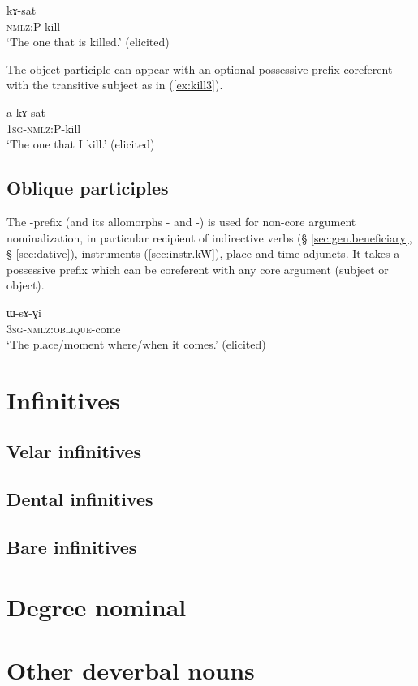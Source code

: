  \begin{exe} 
\ex \label{ex:kill2}
\gll kɤ-sat    \\
   \textsc{nmlz}:P-kill \\
 \glt  `The one that is killed.' (elicited)
 \end{exe}
 
The object participle can appear with an optional possessive prefix coreferent with the transitive subject as in (\ref{ex:kill3}).
  
  \begin{exe}
\ex \label{ex:kill3}
\gll a-kɤ-sat    \\
   \textsc{1sg-nmlz}:P-kill \\
 \glt  `The one that I kill.' (elicited)
 \end{exe}

\subsection{Oblique participles}
The -prefix (and its allomorphs - and -) is used for non-core argument nominalization, in particular recipient of indirective verbs (§ \ref{sec:gen.beneficiary}, § \ref{sec:dative}), instruments (\ref{sec:instr.kW}), place and time adjuncts. It takes a possessive prefix which can be coreferent with any core argument (subject or object).

   \begin{exe}
\ex \label{ex:come}
\gll ɯ-sɤ-ɣi    \\
   \textsc{3sg-nmlz:oblique}-come \\
 \glt  `The place/moment where/when it comes.' (elicited)
 \end{exe}
\section{Infinitives}

\subsection{Velar infinitives} \label{sec:velar.inf}
\subsection{Dental infinitives} \label{sec:dental.inf}
\subsection{Bare infinitives} \label{sec:bare.inf}
\section{Degree nominal}

\section{Other deverbal nouns}